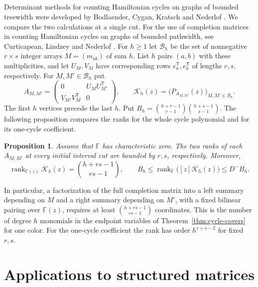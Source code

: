 \documentclass[11pt,reqno]{amsart}
\newtheorem{proposition}[theorem]{Proposition}
\theoremstyle{remark}
\numberwithin{equation}{section}
\newcommand{\rk}{\operatorname{rank}}
\newcommand{\F}{\mathbb F}
\begin{document}
\subsection{}

Determinant methods for counting Hamiltonian cycles on graphs of
bounded treewidth were developed by Bodlaender, Cygan, Kratsch and
Nederlof \cite{BCKN}. We compare the two calculations at a single
cut. For the use of
completion matrices in counting Hamiltonian cycles on graphs
of bounded pathwidth, see Curticapean, Lindzey and Nederlof
\cite{CLN}. For \(h\geq1\)
let \(\mathcal B_h\) be the set of nonnegative \(r\times s\)
integer arrays \(M=(m_{ab})\) of sum \(h\). List \(h\) pairs
\((a,b)\) with these multiplicities, and let \(U_M,V_M\)
have corresponding rows \(e_a^{\mathsf T},e_b^{\mathsf T}\)
of lengths \(r,s\), respectively. For \(M,M'\in\mathcal B_h\)
put
\[
 A_{M,M'}=\begin{pmatrix}
      0&U_M U_{M'}^{\mathsf T}\\
      V_{M'} V_M^{\mathsf T}&0
    \end{pmatrix},\qquad
 \mathcal K_h(z)=\big(P_{A_{M,M'}}(z)\big)_{M,M'\in\mathcal B_h}.
\]
The first \(h\) vertices precede the last \(h\). Put
\(B_h=\binom{h+r-1}{r-1}\binom{h+s-1}{s-1}\).
The following proposition compares the ranks for the whole
cycle polynomial and for its one-cycle coefficient.

\begin{proposition}\label{prop:cycle-cut-rank}
Assume that \(\F\) has characteristic zero. The two ranks of each \(A_{M,M'}\) at every initial interval
cut are bounded by \(r,s\), respectively. Moreover,
\begin{equation}\label{eq:cycle-cut-ranks}
 \rk_{\F(z)}\mathcal K_h(z)=\binom{h+rs-1}{rs-1},\qquad
 B_h\leq \rk_{\F}\big([z]\mathcal K_h(z)\big)\leq D^- B_h .
\end{equation}
\end{proposition}

In particular, a factorization of the full completion matrix
into a left summary depending on \(M\) and a right summary
depending on \(M'\), with a fixed bilinear pairing over
\(\F(z)\), requires at least \(\binom{h+rs-1}{rs-1}\)
coordinates. This is the number of degree \(h\) monomials
in the endpoint variables of Theorem~\ref{thm:cycle-covers}
for one color. For the one-cycle coefficient the rank has
order \(h^{r+s-2}\) for fixed \(r,s\).

\section{Applications to structured matrices}\label{sec:structured}
\end{document}
